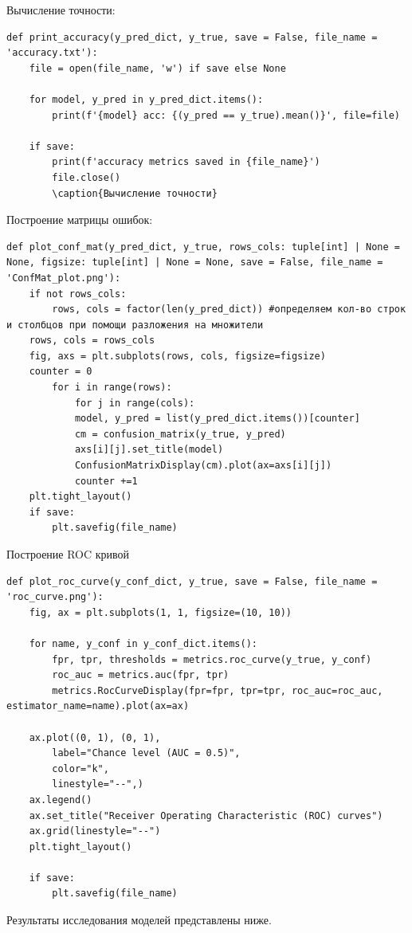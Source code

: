 \documentclass[../document.tex]{subfiles}
\begin{document}
 		\noindent Вычисление точности:
 		\begin{verbatim}
def print_accuracy(y_pred_dict, y_true, save = False, file_name = 'accuracy.txt'):
    file = open(file_name, 'w') if save else None
	
    for model, y_pred in y_pred_dict.items():
        print(f'{model} acc: {(y_pred == y_true).mean()}', file=file)
	
	if save:
	    print(f'accuracy metrics saved in {file_name}')
	    file.close()
	    \caption{Вычисление точности}
 		\end{verbatim}
 		\noindent Построение матрицы ошибок:
 		\begin{verbatim}
def plot_conf_mat(y_pred_dict, y_true, rows_cols: tuple[int] | None = None, figsize: tuple[int] | None = None, save = False, file_name = 'ConfMat_plot.png'):
	if not rows_cols:
		rows, cols = factor(len(y_pred_dict)) #определяем кол-во строк и столбцов при помощи разложения на множители
	rows, cols = rows_cols
	fig, axs = plt.subplots(rows, cols, figsize=figsize)
	counter = 0
		for i in range(rows):
			for j in range(cols):
			model, y_pred = list(y_pred_dict.items())[counter]
			cm = confusion_matrix(y_true, y_pred)
			axs[i][j].set_title(model)
			ConfusionMatrixDisplay(cm).plot(ax=axs[i][j])
			counter +=1
	plt.tight_layout()
	if save:
		plt.savefig(file_name)
 		\end{verbatim}
 		\noindent Построение ROC кривой
 		\begin{verbatim}
def plot_roc_curve(y_conf_dict, y_true, save = False, file_name = 'roc_curve.png'):
	fig, ax = plt.subplots(1, 1, figsize=(10, 10))
	
	for name, y_conf in y_conf_dict.items():
		fpr, tpr, thresholds = metrics.roc_curve(y_true, y_conf)
		roc_auc = metrics.auc(fpr, tpr)
		metrics.RocCurveDisplay(fpr=fpr, tpr=tpr, roc_auc=roc_auc, estimator_name=name).plot(ax=ax)
	
	ax.plot((0, 1), (0, 1), 
		label="Chance level (AUC = 0.5)",
		color="k",
		linestyle="--",)
	ax.legend()
	ax.set_title("Receiver Operating Characteristic (ROC) curves")
	ax.grid(linestyle="--")
	plt.tight_layout()
	
	if save:
		plt.savefig(file_name)
 		\end{verbatim}
 		\par Результаты исследования моделей представлены ниже.
\end{document}
